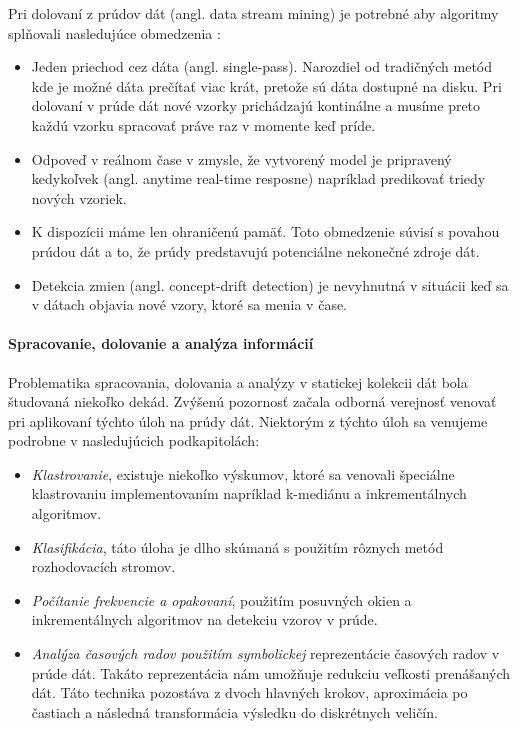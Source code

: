 \par
Pri dolovaní z prúdov dát (angl. data stream mining) je potrebné aby algoritmy splňovali nasledujúce obmedzenia \citep{nguyen2015survey, wadewale2015survey}:
\begin{itemize}
	\item Jeden priechod cez dáta (angl. single-pass). Narozdiel od tradičných metód kde je možné dáta prečítať viac krát, pretože sú dáta dostupné na disku. Pri dolovaní v prúde dát nové vzorky prichádzajú kontinálne a musíme preto každú vzorku spracovať práve raz v momente keď príde.
	\item Odpoveď v reálnom čase v zmysle, že vytvorený model je pripravený kedykoľvek (angl. anytime real-time resposne) napríklad predikovať triedy nových vzoriek.
	\item K dispozícii máme len ohraničenú pamäť. Toto obmedzenie súvisí s povahou prúdou dát a to, že prúdy predstavujú potenciálne nekonečné zdroje dát.
	\item Detekcia zmien (angl. concept-drift detection) je nevyhnutná v situácii keď sa v dátach objavia nové vzory, ktoré sa menia v čase.
\end{itemize}

\paragraph{Spracovanie, dolovanie a analýza informácií} 
Problematika spracovania, dolovania a analýzy v statickej kolekcii dát bola študovaná niekoľko dekád. Zvýšenú pozornosť začala odborná verejnosť venovať pri aplikovaní týchto úloh na prúdy dát. Niektorým z týchto úloh sa venujeme podrobne v nasledujúcich podkapitolách:
\begin{itemize}
	\item \textit{Klastrovanie}, existuje niekoľko výskumov, ktoré sa venovali špeciálne klastrovaniu implementovaním napríklad k-mediánu a inkrementálnych algoritmov.
	\item \textit{Klasifikácia}, táto úloha je dlho skúmaná s použitím rôznych metód rozhodovacích stromov.
	\item \textit{Počítanie frekvencie a opakovaní}, použitím posuvných okien a inkrementálnych algoritmov na detekciu vzorov v prúde.
	\item \textit{Analýza časových radov použitím symbolickej} reprezentácie časových radov v prúde dát. Takáto reprezentácia nám umožňuje redukciu veľkosti prenášaných dát. Táto technika pozostáva z dvoch hlavných krokov, aproximácia po častiach a následná transformácia výsledku do diskrétnych veličín.
\end{itemize}


